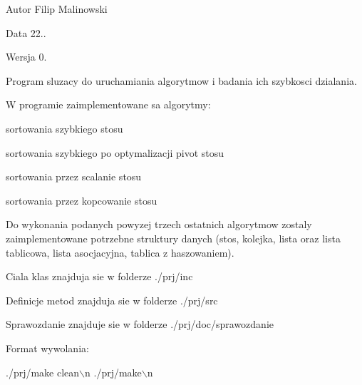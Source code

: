 \begin{DoxyAuthor}{Autor}
Filip Malinowski 
\end{DoxyAuthor}
\begin{DoxyDate}{Data}
22.. 
\end{DoxyDate}
\begin{DoxyVersion}{Wersja}
0.
\end{DoxyVersion}
Program sluzacy do uruchamiania algorytmow i badania ich szybkosci dzialania.\par
W programie zaimplementowane sa algorytmy\-:\par

\begin{DoxyItemize}
\item sortowania szybkiego stosu\par

\item sortowania szybkiego po optymalizacji pivot stosu\par

\item sortowania przez scalanie stosu\par

\item sortowania przez kopcowanie stosu
\end{DoxyItemize}

Do wykonania podanych powyzej trzech ostatnich algorytmow zostaly zaimplementowane potrzebne struktury danych (stos, kolejka, lista oraz lista tablicowa, lista asocjacyjna, tablica z haszowaniem).\par
\par
Ciala klas znajduja sie w folderze ./prj/inc\par
Definicje metod znajduja sie w folderze ./prj/src\par
Sprawozdanie znajduje sie w folderze ./prj/doc/sprawozdanie\par
\par
Format wywolania\-:\par

\begin{DoxyCode}
./prj/make clean\(\backslash\)n
./prj/make\(\backslash\)n
\end{DoxyCode}
 